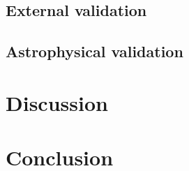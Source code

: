\documentclass[preprint,trackchanges]{aastex}
\newcommand{\project}[1]{\textsl{#1}}
\newcommand{\logg}{\log g}
\newcommand{\teff}{T_{\mathrm{eff}}}
\newcommand{\Nstars}{483,330}
\begin{document}


\subsection{External validation}


\subsection{Astrophysical validation}


\section{Discussion}
\label{sec:discussion}




\section{Conclusion}
\label{sec:conclusion}

\end{document}
